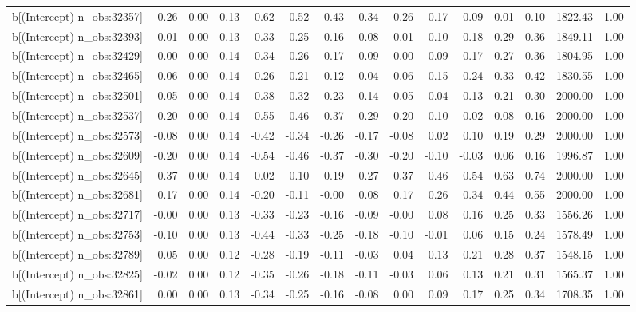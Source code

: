 \begin{table}[ht]
\begin{tabular}{rrrrrrrrrrrrrrr}
  b[(Intercept) n\_obs:32357] & -0.26 & 0.00 & 0.13 & -0.62 & -0.52 & -0.43 & -0.34 & -0.26 & -0.17 & -0.09 & 0.01 & 0.10 & 1822.43 & 1.00 \\ 
  b[(Intercept) n\_obs:32393] & 0.01 & 0.00 & 0.13 & -0.33 & -0.25 & -0.16 & -0.08 & 0.01 & 0.10 & 0.18 & 0.29 & 0.36 & 1849.11 & 1.00 \\ 
  b[(Intercept) n\_obs:32429] & -0.00 & 0.00 & 0.14 & -0.34 & -0.26 & -0.17 & -0.09 & -0.00 & 0.09 & 0.17 & 0.27 & 0.36 & 1804.95 & 1.00 \\ 
  b[(Intercept) n\_obs:32465] & 0.06 & 0.00 & 0.14 & -0.26 & -0.21 & -0.12 & -0.04 & 0.06 & 0.15 & 0.24 & 0.33 & 0.42 & 1830.55 & 1.00 \\ 
  b[(Intercept) n\_obs:32501] & -0.05 & 0.00 & 0.14 & -0.38 & -0.32 & -0.23 & -0.14 & -0.05 & 0.04 & 0.13 & 0.21 & 0.30 & 2000.00 & 1.00 \\ 
  b[(Intercept) n\_obs:32537] & -0.20 & 0.00 & 0.14 & -0.55 & -0.46 & -0.37 & -0.29 & -0.20 & -0.10 & -0.02 & 0.08 & 0.16 & 2000.00 & 1.00 \\ 
  b[(Intercept) n\_obs:32573] & -0.08 & 0.00 & 0.14 & -0.42 & -0.34 & -0.26 & -0.17 & -0.08 & 0.02 & 0.10 & 0.19 & 0.29 & 2000.00 & 1.00 \\ 
  b[(Intercept) n\_obs:32609] & -0.20 & 0.00 & 0.14 & -0.54 & -0.46 & -0.37 & -0.30 & -0.20 & -0.10 & -0.03 & 0.06 & 0.16 & 1996.87 & 1.00 \\ 
  b[(Intercept) n\_obs:32645] & 0.37 & 0.00 & 0.14 & 0.02 & 0.10 & 0.19 & 0.27 & 0.37 & 0.46 & 0.54 & 0.63 & 0.74 & 2000.00 & 1.00 \\ 
  b[(Intercept) n\_obs:32681] & 0.17 & 0.00 & 0.14 & -0.20 & -0.11 & -0.00 & 0.08 & 0.17 & 0.26 & 0.34 & 0.44 & 0.55 & 2000.00 & 1.00 \\ 
  b[(Intercept) n\_obs:32717] & -0.00 & 0.00 & 0.13 & -0.33 & -0.23 & -0.16 & -0.09 & -0.00 & 0.08 & 0.16 & 0.25 & 0.33 & 1556.26 & 1.00 \\ 
  b[(Intercept) n\_obs:32753] & -0.10 & 0.00 & 0.13 & -0.44 & -0.33 & -0.25 & -0.18 & -0.10 & -0.01 & 0.06 & 0.15 & 0.24 & 1578.49 & 1.00 \\ 
  b[(Intercept) n\_obs:32789] & 0.05 & 0.00 & 0.12 & -0.28 & -0.19 & -0.11 & -0.03 & 0.04 & 0.13 & 0.21 & 0.28 & 0.37 & 1548.15 & 1.00 \\ 
  b[(Intercept) n\_obs:32825] & -0.02 & 0.00 & 0.12 & -0.35 & -0.26 & -0.18 & -0.11 & -0.03 & 0.06 & 0.13 & 0.21 & 0.31 & 1565.37 & 1.00 \\ 
  b[(Intercept) n\_obs:32861] & 0.00 & 0.00 & 0.13 & -0.34 & -0.25 & -0.16 & -0.08 & 0.00 & 0.09 & 0.17 & 0.25 & 0.34 & 1708.35 & 1.00 \\ 

\end{tabular}
\end{table}
